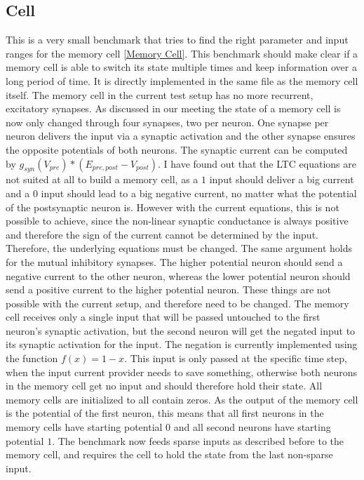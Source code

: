 \documentclass[draft,final]{vutinfth} %
\begin{document}
\subsection{Cell}
This is a very small benchmark that tries to find the right parameter and input ranges for the memory cell \ref{Memory Cell}.
This benchmark should make clear if a memory cell is able to switch its state multiple times and keep information over a long period of time.
It is directly implemented in the same file as the memory cell itself.
The memory cell in the current test setup has no more recurrent, excitatory synapses. 
As discussed in our meeting the state of a memory cell is now only changed through four synapses, two per neuron.
One synapse per neuron delivers the input via a synaptic activation and the other synapse ensures the opposite potentials of both neurons. 
The synaptic current can be computed by $g_{syn}(V_{pre}) * (E_{pre,post} - V_{post})$.
I have found out that the LTC equations are not suited at all to build a memory cell, as a $1$ input should deliver a big current and a $0$ input should lead to a big negative current, no matter what the potential of the postsynaptic neuron is. 
However with the current equations, this is not possible to achieve, since the non-linear synaptic conductance is always positive and therefore the sign of the current cannot be determined by the input. 
Therefore, the underlying equations must be changed.
The same argument holds for the mutual inhibitory synapses. The higher potential neuron should send a negative current to the other neuron, whereas the lower potential neuron should send a positive current to the higher potential neuron. 
These things are not possible with the current setup, and therefore need to be changed.
The memory cell receives only a single input that will be passed untouched to the first neuron's synaptic activation, but the second neuron will get the negated input to its synaptic activation for the input. 
The negation is currently implemented using the function $f(x) = 1-x$.
This input is only passed at the specific time step, when the input current provider needs to save something, otherwise both neurons in the memory cell get no input and should therefore hold their state.
All memory cells are initialized to all contain zeros.
As the output of the memory cell is the potential of the first neuron, this means that all first neurons in the memory cells have starting potential $0$ and all second neurons have starting potential $1$.
The benchmark now feeds sparse inputs as described before to the memory cell, and requires the cell to hold the state from the last non-sparse input. 
\end{document}
